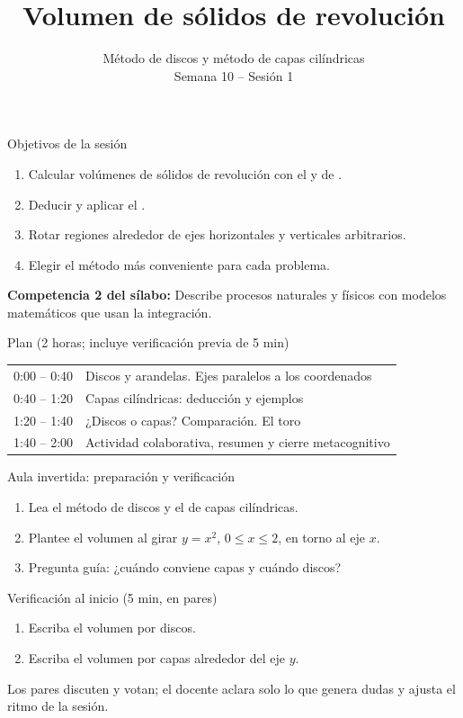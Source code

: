 \documentclass[10pt,aspectratio=169]{beamer}
\title[Sólidos de revolución]{Volumen de sólidos de revolución}
\subtitle{Método de discos y método de capas cilíndricas\\[2pt]\small Semana 10 -- Sesión 1}
\begin{document}
\begin{frame}
  \titlepage
\end{frame}

\begin{frame}{Objetivos de la sesión}
  \begin{enumerate}
    \item Calcular volúmenes de sólidos de revolución con el  y de .
    \item Deducir y aplicar el .
    \item Rotar regiones alrededor de ejes horizontales y verticales arbitrarios.
    \item Elegir el método más conveniente para cada problema.
  \end{enumerate}
  \vspace{1mm}
  {\small\textbf{Competencia 2 del sílabo:} Describe procesos naturales y físicos con modelos matemáticos que usan la integración.}
  \begin{block}{Plan (2 horas; incluye verificación previa de 5 min)}
    \begin{tabular}{ll}
      0:00 -- 0:40 & Discos y arandelas. Ejes paralelos a los coordenados\\
      0:40 -- 1:20 & Capas cilíndricas: deducción y ejemplos\\
      1:20 -- 1:40 & ¿Discos o capas? Comparación. El toro\\
      1:40 -- 2:00 & Actividad colaborativa, resumen y cierre metacognitivo
    \end{tabular}
  \end{block}
\end{frame}

\begin{frame}{Aula invertida: preparación y verificación}
  \small
  \begin{previa}
    \begin{enumerate}
      \item Lea el método de discos y el de capas cilíndricas.
      \item Plantee el volumen al girar $y=x^2$, $0\le x\le2$, en torno al eje $x$.
      \item Pregunta guía: ¿cuándo conviene capas y cuándo discos?
    \end{enumerate}
  \end{previa}
  \begin{block}{Verificación al inicio (5 min, en pares)}
    \begin{enumerate}
      \item Escriba el volumen por discos.
      \item Escriba el volumen por capas alrededor del eje $y$.
    \end{enumerate}
    Los pares discuten y votan; el docente aclara solo lo que genera dudas y ajusta el ritmo de la sesión.
  \end{block}
\end{frame}
\end{document}
